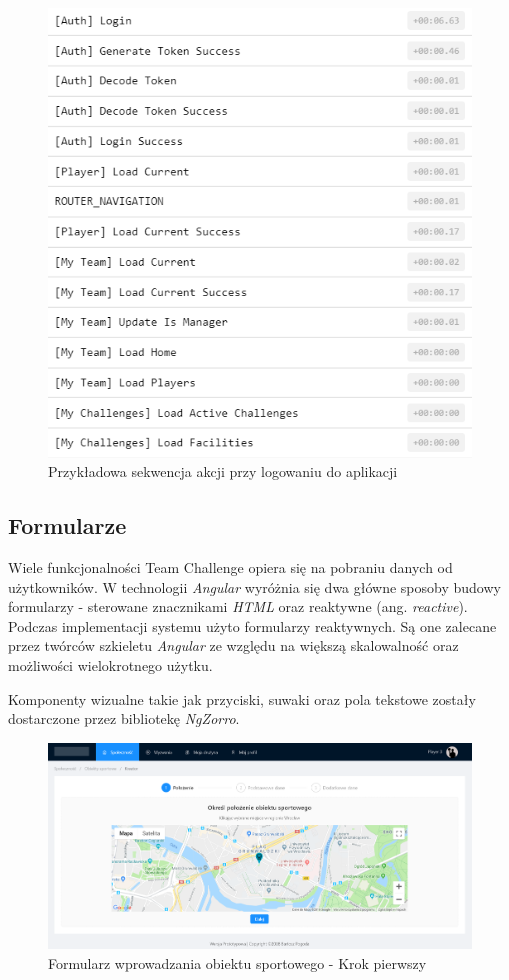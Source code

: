 \begin{figure}[H]
\centering
\includegraphics[width=0.5\linewidth]{06-implementacja/rys/actions.PNG}
\caption{Przykładowa sekwencja akcji przy logowaniu do aplikacji}
\label{fig:actions}
\end{figure}


\subsection{Formularze}

Wiele funkcjonalności Team Challenge opiera się na pobraniu danych od użytkowników. W technologii \textit{Angular} wyróżnia się dwa główne sposoby budowy formularzy - sterowane znacznikami \textit{HTML} oraz reaktywne (ang. \textit{reactive}). Podczas implementacji systemu użyto formularzy reaktywnych. Są one zalecane przez twórców szkieletu \textit{Angular} ze względu na większą skalowalność oraz możliwości wielokrotnego użytku. 

Komponenty wizualne takie jak przyciski, suwaki oraz pola tekstowe zostały dostarczone przez bibliotekę \textit{NgZorro}. 

\begin{figure}[H]
\centering
\includegraphics[width=\linewidth]{06-implementacja/rys/form1.PNG}
\caption{Formularz wprowadzania obiektu sportowego - Krok pierwszy}
\label{fig:sample-form}
\end{figure}



